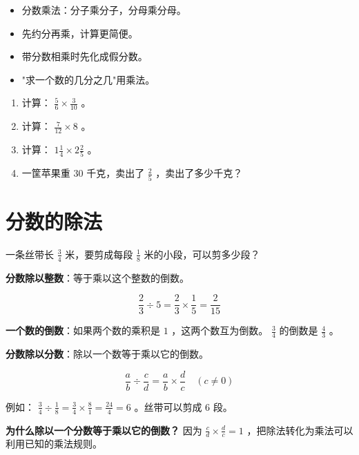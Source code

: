 \begin{keytakeaway}


\begin{itemize}
  \item 分数乘法：分子乘分子，分母乘分母。
  \item 先约分再乘，计算更简便。
  \item 带分数相乘时先化成假分数。
  \item "求一个数的几分之几"用乘法。
\end{itemize}


\end{keytakeaway}

\begin{practice}


\begin{enumerate}
  \item 计算： $\frac{5}{6} \times \frac{3}{10}$ 。
  \item 计算： $\frac{7}{12} \times 8$ 。
  \item 计算： $1\frac{1}{4} \times 2\frac{2}{5}$ 。
  \item 一筐苹果重 $30$ 千克，卖出了 $\frac{2}{5}$ ，卖出了多少千克？
\end{enumerate}


\end{practice}

\section*{分数的除法}


\begin{explore}


一条丝带长 $\frac{3}{4}$ 米，要剪成每段 $\frac{1}{8}$ 米的小段，可以剪多少段？

\end{explore}

\begin{understand}


\textbf{分数除以整数}：等于乘以这个整数的倒数。

\[
\frac{2}{3} \div 5 = \frac{2}{3} \times \frac{1}{5} = \frac{2}{15}
\]


\textbf{一个数的倒数}：如果两个数的乘积是 $1$ ，这两个数互为倒数。 $\frac{3}{4}$ 的倒数是 $\frac{4}{3}$ 。

\textbf{分数除以分数}：除以一个数等于乘以它的倒数。

\[
\frac{a}{b} \div \frac{c}{d} = \frac{a}{b} \times \frac{d}{c} \quad (c \neq 0)
\]


例如： $\frac{3}{4} \div \frac{1}{8} = \frac{3}{4} \times \frac{8}{1} = \frac{24}{4} = 6$ 。丝带可以剪成 $6$ 段。

\textbf{为什么除以一个分数等于乘以它的倒数？} 因为 $\frac{c}{d} \times \frac{d}{c} = 1$ ，把除法转化为乘法可以利用已知的乘法规则。

\end{understand}

